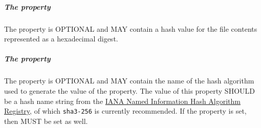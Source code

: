 \subparagraph{The  property}\label{sec:hash}
The  property is OPTIONAL and MAY contain a hash value for the file contents represented as a hexadecimal digest.

\subparagraph{The  property}\label{sec:hashAlgorithm}
The  property is OPTIONAL and MAY contain the name of the hash algorithm used to generate the value of the  property.
The value of this property SHOULD be a hash name string from the \href{https://www.iana.org/assignments/named-information/named-information.xhtml}{IANA Named Information Hash Algorithm Registry}, of which \texttt{sha3-256} is currently recommended.
If the  property is set, then  MUST be set as well.